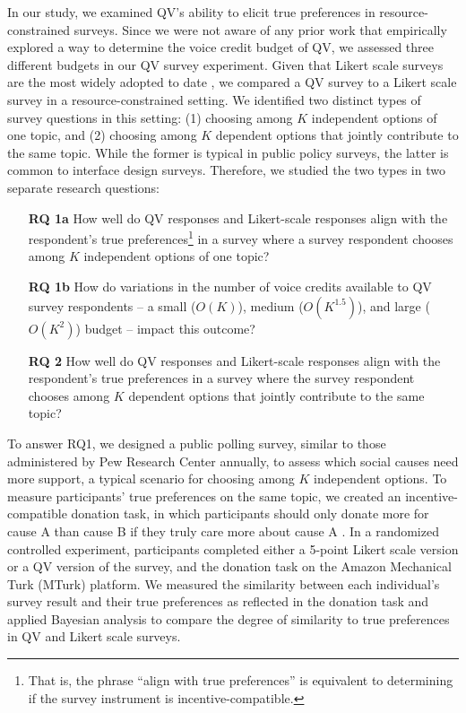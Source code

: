 In our study, we examined QV's ability to elicit true preferences in resource-constrained surveys. Since we were not aware of any prior work that empirically explored a way to determine the voice credit budget of QV, we assessed three different budgets in our QV survey experiment. Given that Likert scale surveys are the most widely adopted to date \cite{moors2016two}, we compared a QV survey to a Likert scale survey \cite{likert1932technique} in a resource-constrained setting. We identified two distinct types of survey questions in this setting: (1) choosing among $K$ independent options of one topic, and (2) choosing among $K$ dependent options that jointly contribute to the same topic. While the former is typical in public policy surveys, the latter is common to interface design surveys. Therefore, we studied the two types in two separate research questions:



\begin{itemize}
    \item[\textbf{RQ 1a}] How well do QV responses and Likert-scale responses align with the respondent's true preferences\footnote{That is, the phrase ``align with true preferences'' is equivalent to determining if the survey instrument is incentive-compatible.} in a survey where a survey respondent chooses among $K$ independent options of one topic? 
    
    \item[\textbf{RQ 1b}] How do variations in the number of voice credits available to QV survey respondents -- a small ($O(K)$), medium ($O(K^{1.5})$), and large ($O(K^2)$) budget -- impact this outcome?

    \item[\textbf{RQ 2}] How well do QV responses and Likert-scale responses align with the respondent's true preferences in a survey where the survey respondent chooses among $K$ dependent options that jointly contribute to the same topic? 
\end{itemize}

To answer RQ1, we designed a public polling survey, similar to those administered by Pew Research Center annually, to assess which social causes need more support, a typical scenario for choosing among $K$ independent options. To measure participants' true preferences on the same topic, we created an incentive-compatible donation task, in which participants should only donate more for cause A than cause B if they truly care more about cause A \cite{champ1997using}. In a randomized controlled experiment, participants completed either a 5-point Likert scale version or a QV version of the survey, and the donation task on the Amazon Mechanical Turk (MTurk) platform. We measured the similarity between each individual's survey result and their true preferences as reflected in the donation task and applied Bayesian analysis to compare the degree of similarity to true preferences in QV and Likert scale surveys.

